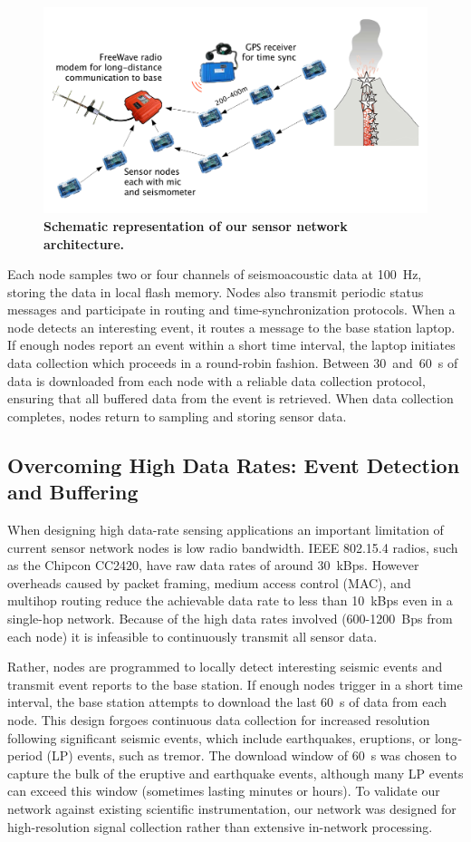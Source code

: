 \begin{figure}[t]
\begin{center}
\includegraphics[width=0.7\hsize]{./3-evaluation/figs/architecture.pdf}
\end{center}
\caption{\textbf{Schematic representation of our sensor network
architecture.}}
\label{evaluation-fig-architecture}
\end{figure}

Each node samples two or four channels of seismoacoustic data at 100~Hz,
storing the data in local flash memory. Nodes also transmit periodic status
messages and participate in routing and time-synchronization protocols. When
a node detects an interesting event, it routes a message to the base station
laptop. If enough nodes report an event within a short time interval, the
laptop initiates data collection which proceeds in a round-robin fashion.
Between 30~and~60~s of data is downloaded from each node with a reliable data
collection protocol, ensuring that all buffered data from the event is
retrieved. When data collection completes, nodes return to sampling and
storing sensor data.

\subsection{Overcoming High Data Rates: Event Detection and Buffering}

When designing high data-rate sensing applications an important limitation of
current sensor network nodes is low radio bandwidth. IEEE 802.15.4 radios,
such as the Chipcon CC2420, have raw data rates of around 30~kBps. However
overheads caused by packet framing, medium access control (MAC), and multihop
routing reduce the achievable data rate to less than 10~kBps even in a
single-hop network. Because of the high data rates involved (600-1200~Bps
from each node) it is infeasible to continuously transmit all sensor data.

Rather, nodes are programmed to locally detect interesting seismic events and
transmit event reports to the base station. If enough nodes trigger in a
short time interval, the base station attempts to download the last 60~s of
data from each node. This design forgoes continuous data collection for
increased resolution following significant seismic events, which include
earthquakes, eruptions, or long-period (LP) events, such as tremor. The
download window of 60~s was chosen to capture the bulk of the eruptive and
earthquake events, although many LP events can exceed this window (sometimes
lasting minutes or hours). To validate our network against existing
scientific instrumentation, our network was designed for high-resolution
signal collection rather than extensive in-network processing.

